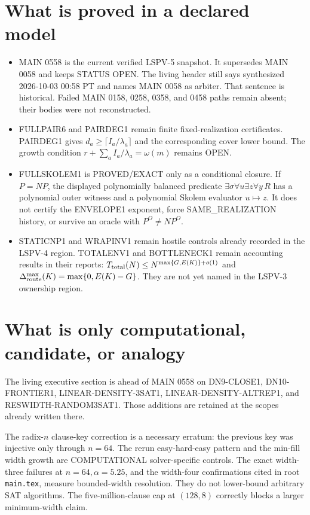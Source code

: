 \documentclass[11pt]{article}
\begin{document}
\section*{What is proved in a declared model}
\begin{itemize}
\item MAIN 0558 is the current verified LSPV-5 snapshot. It supersedes MAIN 0058 and
keeps STATUS OPEN. The living header still says synthesized 2026-10-03 00:58 PT and
names MAIN 0058 as arbiter. That sentence is historical. Failed MAIN 0158, 0258, 0358,
and 0458 paths remain absent; their bodies were not reconstructed.
\item FULLPAIR6 and PAIRDEG1 remain finite fixed-realization certificates. PAIRDEG1 gives
\(d_a\ge\lceil I_a/\lambda_a\rceil\) and the corresponding cover lower bound. The growth
condition \(r+\sum_a I_a/\lambda_a=\omega(m)\) remains OPEN.
\item FULLSKOLEM1 is PROVED/EXACT only as a conditional closure. If \(P=NP\), the displayed
polynomially balanced predicate \(\exists\sigma\forall u\exists z\forall y\,R\) has a
polynomial outer witness and a polynomial Skolem evaluator \(u\mapsto z\). It does not
certify the ENVELOPE1 exponent, force SAME\_REALIZATION history, or survive an oracle
with \(P^O\neq NP^O\).
\item STATICNP1 and WRAPINV1 remain hostile controls already recorded in the LSPV-4
region. TOTALENV1 and BOTTLENECK1 remain accounting results in their reports:
\(T_{\rm total}(N)\le N^{\max\{G,E(K)\}+o(1)}\) and
\(\Delta_{\rm route}^{\max}(K)=\max\{0,E(K)-G\}\). They are not yet named in the
LSPV-3 ownership region.
\end{itemize}

\section*{What is only computational, candidate, or analogy}
The living executive section is ahead of MAIN 0558 on DN9-CLOSE1, DN10-FRONTIER1,
LINEAR-DENSITY-3SAT1, LINEAR-DENSITY-ALTREP1, and RESWIDTH-RANDOM3SAT1. Those additions
are retained at the scopes already written there.

The radix-\(n\) clause-key correction is a necessary erratum: the previous key was
injective only through \(n=64\). The rerun easy-hard-easy pattern and the min-fill width
growth are COMPUTATIONAL solver-specific controls. The exact width-three failures at
\(n=64,\alpha=5.25\), and the width-four confirmations cited in root \texttt{main.tex},
measure bounded-width resolution. They do not lower-bound arbitrary SAT algorithms.
The five-million-clause cap at \((128,8)\) correctly blocks a larger minimum-width claim.
\end{document}
